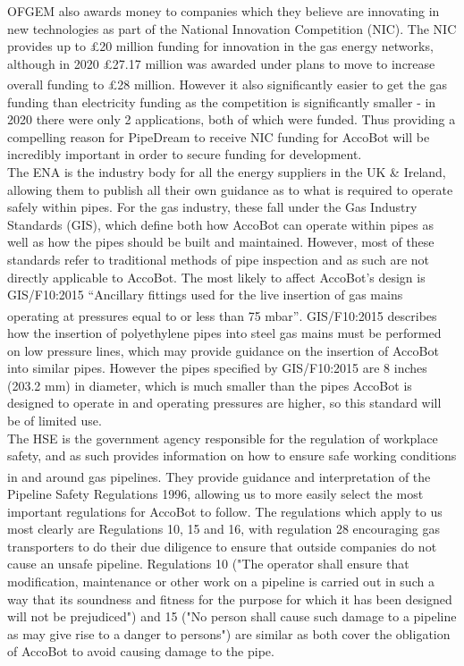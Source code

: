 \documentclass[11pt]{article}		%
\newcommand{\supercite}[1]{\textsuperscript{\cite{#1}}}		%
\begin{document}
			OFGEM also awards money to companies which they believe are innovating in new technologies as part of the National Innovation Competition (NIC).
			The NIC provides up to £20 million funding for innovation in the gas energy networks, although in 2020 £27.17 million was awarded under plans to move to increase overall funding to £28 million\supercite{ofgem2020nic}.
			However it also significantly easier to get the gas funding than electricity funding as the competition is significantly smaller - in 2020 there were only 2 applications, both of which were funded.
			Thus providing a compelling reason for PipeDream to receive NIC funding for AccoBot will be incredibly important in order to secure funding for development.
			\\
			The ENA is the industry body for all the energy suppliers in the UK \& Ireland, allowing them to publish all their own guidance as to what is required to operate safely within pipes.
			For the gas industry, these fall under the Gas Industry Standards (GIS), which define both how AccoBot can operate within pipes as well as how the pipes should be built and maintained.
			However, most of these standards refer to traditional methods of pipe inspection and as such are not directly applicable to AccoBot.
			The most likely to affect AccoBot's design is GIS/F10:2015 “Ancillary fittings used for the live insertion of gas mains operating at pressures equal to or less than 75 mbar”\supercite{energy2015gas}.
			GIS/F10:2015 describes how the insertion of polyethylene pipes into steel gas mains must be performed on low pressure lines, which may provide guidance on the insertion of AccoBot into similar pipes.
			However the pipes specified by 	GIS/F10:2015 are 8 inches (203.2 mm) in diameter, which is much smaller than the pipes AccoBot is designed to operate in and operating pressures are higher, so this standard will be of limited use.
			\\
			The HSE is the government agency responsible for the regulation of workplace safety, and as such provides information on how to ensure safe working conditions in and around gas pipelines.
			They provide guidance and interpretation\supercite{hse1996guide} of the Pipeline Safety Regulations 1996, allowing us to more easily select the most important regulations for AccoBot to follow.
			The regulations which apply to us most clearly are Regulations 10, 15 and 16, with regulation 28 encouraging gas transporters to do their due diligence to ensure that outside companies do not cause an unsafe pipeline.
			Regulations 10 ("The operator shall ensure that modification, maintenance or other work on a pipeline is carried out in such a way that its soundness and fitness for the purpose for which it has been designed will not be prejudiced") and 15 ("No person shall cause such damage to a pipeline as may give rise to a danger to persons") are similar as both cover the obligation of AccoBot to avoid causing damage to the pipe.
\end{document}
